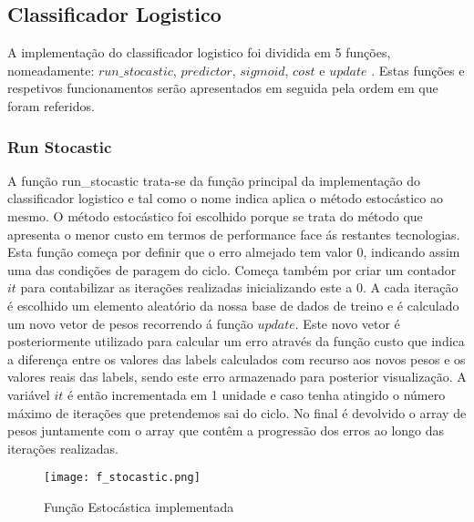 \subsection{Classificador Logistico}


A implementação do classificador logistico foi dividida em 5 funções, nomeadamente: $run\_stocastic$, $predictor$, $sigmoid$, $cost$ e $update$ . Estas funções e respetivos funcionamentos serão apresentados em seguida pela ordem em que foram referidos.\newline



\subsubsection{Run Stocastic}\hfill\newline
	\hfill\newline

	A função run\_stocastic trata-se da função principal da implementação do classificador logistico e tal como o nome indica aplica o método estocástico ao mesmo. O método estocástico foi escolhido porque se trata do método que apresenta o menor custo em termos de performance face ás restantes tecnologias\cite{ref6,ref7}.\newline
	Esta função começa por definir que o erro almejado tem valor 0, indicando assim uma das condições de paragem do ciclo. Começa também por criar um contador $it$ para contabilizar as iterações realizadas inicializando este a 0.\newline
	A cada iteração é escolhido um elemento aleatório da nossa base de dados de treino e é calculado um novo vetor de pesos recorrendo á função $update$. Este novo vetor é posteriormente utilizado para calcular um erro através da função custo que indica a diferença entre os valores das labels calculados com recurso aos novos pesos e os valores reais das labels, sendo este erro armazenado para posterior visualização. A variável $it$ é então incrementada em 1 unidade e caso tenha atingido o número máximo de iterações que pretendemos sai do ciclo. 
	No final é devolvido o array de pesos juntamente com o array que contêm a progressão dos erros ao longo das iterações realizadas.

	\begin{figure}[H]

	  \centering
	  \captionsetup{justification=centering}

	  \texttt{[image: f\_stocastic.png]}
	  
	  \caption {Função Estocástica implementada}
	\end{figure}



